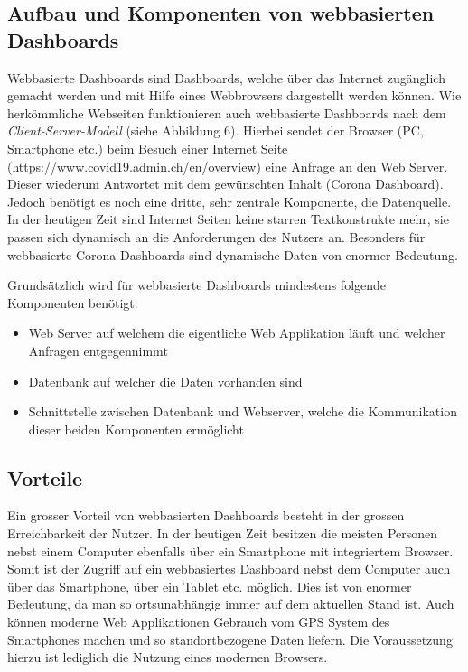 \documentclass[12pt, oneside]{article}
\begin{document}
\subsection{Aufbau und Komponenten von webbasierten Dashboards}
Webbasierte Dashboards sind Dashboards, welche über das Internet zugänglich gemacht werden und mit Hilfe eines Webbrowsers dargestellt werden können. Wie herkömmliche Webseiten funktionieren auch webbasierte Dashboards nach dem \textit{Client-Server-Modell} (siehe Abbildung 6). Hierbei sendet der Browser (PC, Smartphone etc.) beim Besuch einer Internet Seite (\url{https://www.covid19.admin.ch/en/overview}) eine Anfrage an den Web Server. Dieser wiederum Antwortet mit dem gewünschten Inhalt (Corona Dashboard). Jedoch benötigt es noch eine dritte, sehr zentrale Komponente, die Datenquelle. In der heutigen Zeit sind Internet Seiten keine starren Textkonstrukte mehr, sie passen sich dynamisch an die Anforderungen des Nutzers an. Besonders für webbasierte Corona Dashboards sind dynamische Daten von enormer Bedeutung. 

Grundsätzlich wird für webbasierte Dashboards mindestens folgende Komponenten benötigt:
\begin{itemize}
    \item Web Server auf welchem die eigentliche Web Applikation läuft und welcher Anfragen entgegennimmt
    \item Datenbank auf welcher die Daten vorhanden sind
    \item Schnittstelle zwischen Datenbank und Webserver, welche die Kommunikation dieser beiden Komponenten ermöglicht
\end{itemize}

\subsection{Vorteile}

Ein grosser Vorteil von webbasierten Dashboards besteht in der grossen Erreichbarkeit der Nutzer. In der heutigen Zeit besitzen die meisten Personen nebst einem Computer ebenfalls über ein Smartphone mit integriertem Browser. Somit ist der Zugriff auf ein webbasiertes Dashboard nebst dem Computer auch über das Smartphone, über ein Tablet etc. möglich. Dies ist von enormer Bedeutung, da man so ortsunabhängig immer auf dem aktuellen Stand ist. Auch können moderne Web Applikationen Gebrauch vom GPS System des Smartphones machen und so standortbezogene Daten liefern. Die Voraussetzung hierzu ist lediglich die Nutzung eines modernen Browsers.
\end{document}
